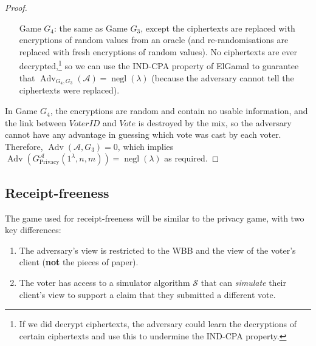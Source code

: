 \documentclass[12pt,a4paper]{article}
\DeclareMathOperator{\negl}{\text{negl}}
\DeclareMathOperator{\Adv}{\text{Adv}}
\theoremstyle{definition}
\newcommand{\Vote}{\mathit{Vote}}
\newcommand{\VoterID}{\mathit{VoterID}}
\begin{document}
\begin{proof}
\begin{itemize}[leftmargin=4em]
        \item[Game] $G_4$: the same as Game $G_3$, except the ciphertexts are replaced with encryptions of random values from an oracle (and re-randomisations are replaced with fresh encryptions of random values). No ciphertexts are ever decrypted,\footnote{If we did decrypt ciphertexts, the adversary could learn the decryptions of certain ciphertexts and use this to undermine the IND-CPA property.} so we can use the IND-CPA property of ElGamal to guarantee that $\Adv_{G_4,G_3}(\mathcal{A})=\negl(\lambda)$ (because the adversary cannot tell the ciphertexts were replaced).
    \end{itemize}
    In Game $G_4$, the encryptions are random and contain no usable information, and the link between $\VoterID$ and $\Vote$ is destroyed by the mix, so the adversary cannot have any advantage in guessing which vote was cast by each voter. Therefore, $\Adv(\mathcal{A}, G_3)=0$, which implies $\Adv\left(G^\mathcal{A}_{\text{Privacy}}(1^\lambda, n, m)\right)=\negl(\lambda)$ as required.
\end{proof}
\subsection{Receipt-freeness}
The game used for receipt-freeness will be similar to the privacy game, with two key differences:
\begin{enumerate}
    \item The adversary's view is restricted to the WBB and the view of the voter's client (\textbf{not} the pieces of paper).
    \item The voter has access to a simulator algorithm $\mathcal{S}$ that can \textit{simulate} their client's view to support a claim that they submitted a different vote.
\end{enumerate}
\end{document}
